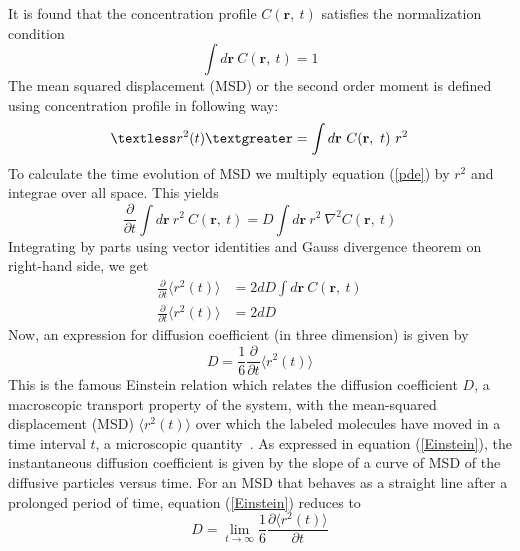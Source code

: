       It is found that the concentration profile  $C(\textbf{r},~t)$ satisfies the normalization condition
       \begin{equation}
           \label{normalization}
           \int d\textbf{r}~C(\textbf{r},~t) = 1
         \end{equation} 
 The mean squared displacement (MSD) or the second order moment is defined using concentration profile in following way:
     \begin{equation}
     \label{SOM}
     \textless r^2(t) \textgreater = \int d\textbf{r}~C(\textbf{r},~t)~r^2
     \end{equation}        
 To calculate the time evolution of MSD we multiply equation (\ref{pde}) by $r^2$ and integrae over all space. This yields  
\begin{equation}
 \frac{\partial}{\partial t} \int d\textbf{r}~r^2~C(\textbf{r},~t) = D  \int d\textbf{r}~r^2~\nabla^2C(\textbf{r},~t)
\end{equation}
 Integrating by parts using vector identities and Gauss divergence theorem on right-hand side, we get       
 \begin{align}
  \frac{\partial}{\partial t}\langle r^2(t) \rangle & = 2dD \int d\textbf{r}~ C(\textbf{r},~t)\nonumber\\
  \frac{\partial}{\partial t}\langle r^2(t) \rangle & = 2dD 
   \end{align}  
   Now,  an expression for diffusion coefficient (in three dimension) is given by 
    \begin{equation}
        \label{Einstein}
        D = \frac{1}{6} \frac{\partial}{\partial t} \langle r^2(t) \rangle
        \end{equation}  
 This is the famous Einstein relation which relates the diffusion coefficient $D$, a macroscopic transport property of the system, with the mean-squared displacement (MSD) $\langle r^2(t) \rangle$ over which the labeled molecules  have moved in a time interval $t$, a microscopic quantity~\citep{Frenkel2002}. As expressed in equation (\ref{Einstein}), the instantaneous diffusion coefficient is given by the slope of a curve of MSD of the diffusive particles versus time. For an MSD that behaves as a straight line after a prolonged period of time, equation (\ref{Einstein}) reduces to
     \begin{equation}
     \label{Einstein1}
     D = \lim_{t \to \infty} \frac{1}{6}\frac{\partial \langle r^2(t) \rangle}{\partial t}
     \end{equation}
     
